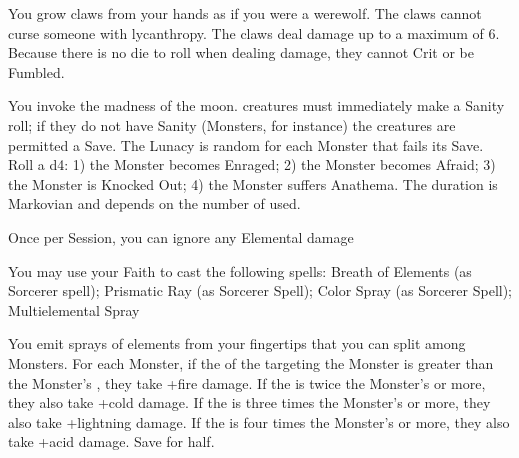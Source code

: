 {\LITURGY [
  Name= Claws of the Lycanthrope,
  Link=shul-liturgy-claws-lycanthrope,
  Paradigm= Biomancy ,
  Save=  N ,
  Duration= Session ,
  Counter=  n/a  ,
  Keywords= None ,
  Target=   Self
]



You grow claws from your hands as if you were a werewolf.  The claws cannot curse someone with lycanthropy.  The claws deal \DICE damage up to a maximum of 6. Because there is no die to roll when dealing damage, they cannot Crit or be Fumbled. 

\LITURGY [
  Name= Lunacy,
  Link=shul-liturgy-lunacy,
  Paradigm= Mind ,
  Save=  Y (negates) ,
  Duration= Markovian ,
  Counter=  n/a  ,
  Keywords= Splittable ,
  Target=   \DICE Close or Nearby creatures
]



You invoke the madness of the moon.  \DICE creatures must immediately make a Sanity roll; if they do not have Sanity (Monsters, for instance) the creatures are permitted a Save.
The Lunacy is random for each Monster that fails its Save.  Roll a d4:  1) the Monster becomes Enraged; 2) the Monster becomes Afraid; 3) the Monster is Knocked Out; 4) the Monster suffers Anathema.  The duration is Markovian and depends on the number of \DICE used.


\GOD[
Name=Tiamat,
Link=small-god-tiamat,
GodOf=Fiendish Prince of Tempests,
Holy=a five pointed star worn from a necklace
]


Once per Session, you can ignore any Elemental damage


You may use your Faith to cast the following spells: Breath of Elements (as Sorcerer spell); Prismatic Ray (as Sorcerer Spell); Color Spray (as Sorcerer Spell); Multielemental Spray


\LITURGY [
  Name= Multielemental Spray,
  Link= tiamat-liturgy-multielemental-spray,
  Paradigm= Elements ,
  Save=  Y (half) ,
  Duration= 0 ,
  Counter=  n/a  ,
  Keywords= Splittable ,
  Target=   Close or Nearby Monster(s)
]



You emit \DICE sprays of elements from your fingertips that you can split among \DICE Monsters.  For each Monster, if the \SUMDICE of the \DICE targeting the Monster is greater than the Monster's \HD, they take \DICE+\DICE fire damage.  If the \SUMDICE is twice the Monster's \HD or more, they also take \DICE+\DICE cold damage.  If the \SUMDICE is three times the Monster's \HD or more, they also take \DICE+\DICE lightning damage.  If the \SUMDICE is four times the Monster's \HD or more, they also take \DICE+\DICE acid damage.  Save for half.


}

